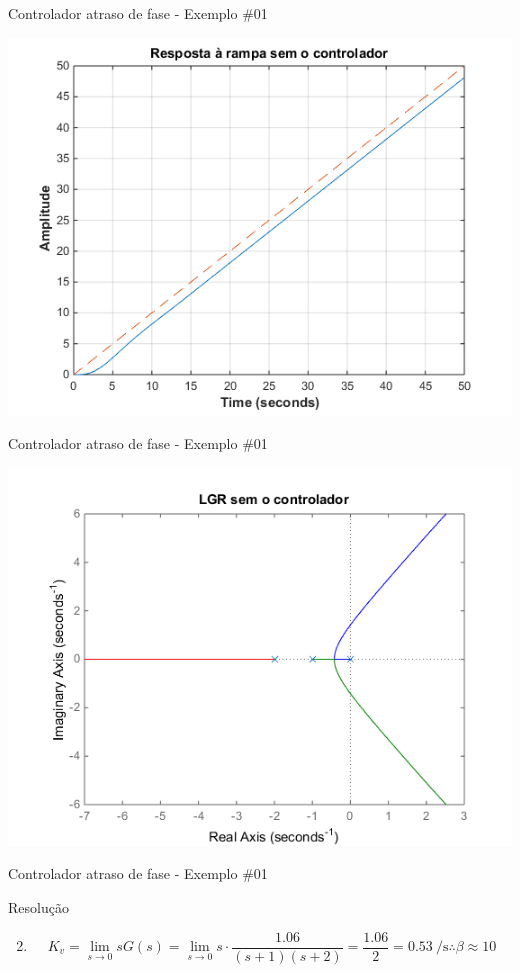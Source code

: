 \begin{frame}{Controlador atraso de fase - Exemplo \#01}
\centerline{\includegraphics[width=0.8\linewidth]{Figuras/Ch09/fig11.png}}
\end{frame}

\begin{frame}{Controlador atraso de fase - Exemplo \#01}
\centerline{\includegraphics[width=0.8\linewidth]{Figuras/Ch09/fig12.png}}
\end{frame}

\begin{frame}{Controlador atraso de fase - Exemplo \#01}
\begin{block}{Resolução}
\begin{enumerate}
	\setcounter{enumi}{1}
	\item \[ K_v=\lim\limits_{s\to0}sG(s)=\lim\limits_{s\to0}s\cdot\dfrac{\num{1,06}}{(s+1)(s+2)}=\dfrac{\num{1,06}}{2}=\SI[per-mode=reciprocal]{0,53}{\per\second}\therefore\beta\approx10 \]
\end{enumerate}
\end{block}
\end{frame}



